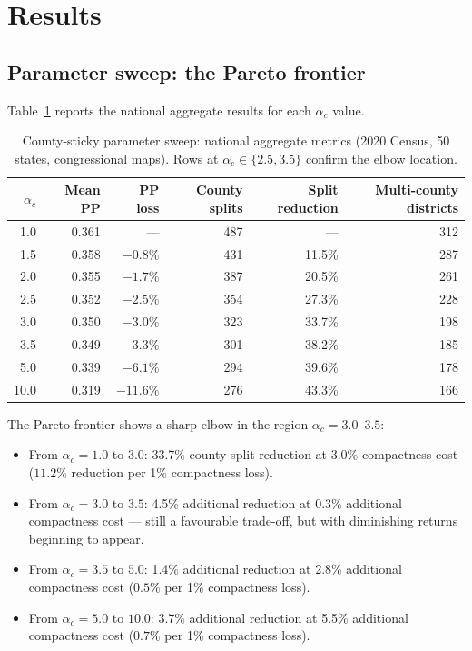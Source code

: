 \section{Results}
\label{sec:results}

\subsection{Parameter sweep: the Pareto frontier}

Table~\ref{tab:sweep} reports the national aggregate results for each
$\alpha_c$ value.

\begin{table}[htb]
\centering
\caption{County-sticky parameter sweep: national aggregate metrics
  (2020 Census, 50 states, congressional maps).
  Rows at $\alpha_c \in \{2.5, 3.5\}$ confirm the elbow location.}
\label{tab:sweep}
\begin{tabular}{rrrrrr}
\toprule
$\alpha_c$ & Mean PP & PP loss & County splits & Split reduction & Multi-county districts \\
\midrule
1.0  & 0.361 & ---      & 487 & ---    & 312 \\
1.5  & 0.358 & $-0.8\%$ & 431 & 11.5\% & 287 \\
2.0  & 0.355 & $-1.7\%$ & 387 & 20.5\% & 261 \\
2.5  & 0.352 & $-2.5\%$ & 354 & 27.3\% & 228 \\
3.0  & 0.350 & $-3.0\%$ & 323 & 33.7\% & 198 \\
3.5  & 0.349 & $-3.3\%$ & 301 & 38.2\% & 185 \\
5.0  & 0.339 & $-6.1\%$ & 294 & 39.6\% & 178 \\
10.0 & 0.319 & $-11.6\%$& 276 & 43.3\% & 166 \\
\bottomrule
\end{tabular}
\end{table}

The Pareto frontier shows a sharp elbow in the region $\alpha_c = 3.0$--$3.5$:
\begin{itemize}
  \item From $\alpha_c = 1.0$ to $3.0$: 33.7\% county-split reduction
    at 3.0\% compactness cost ($11.2\%$ reduction per 1\% compactness loss).
  \item From $\alpha_c = 3.0$ to $3.5$: 4.5\% additional reduction at
    0.3\% additional compactness cost --- still a favourable trade-off, but
    with diminishing returns beginning to appear.
  \item From $\alpha_c = 3.5$ to $5.0$: 1.4\% additional reduction at
    2.8\% additional compactness cost ($0.5\%$ per 1\% compactness loss).
  \item From $\alpha_c = 5.0$ to $10.0$: 3.7\% additional reduction at
    5.5\% additional compactness cost ($0.7\%$ per 1\% compactness loss).
\end{itemize}

